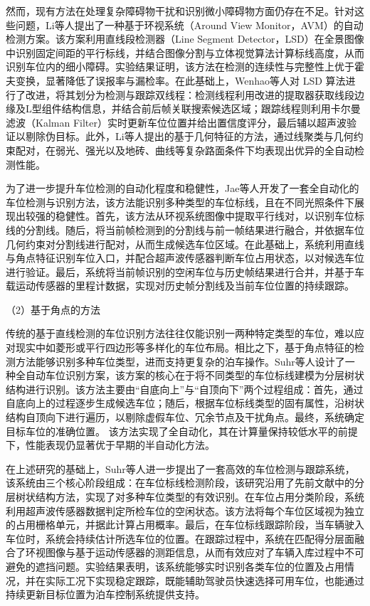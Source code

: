 然而，现有方法在处理复杂障碍物干扰和识别微小障碍物方面仍存在不足。针对这些问题，Li等人\cite{li2017automatic}提出了一种基于环视系统（Around View Monitor，AVM）的自动检测方案。该方案利用直线段检测器（Line Segment Detector，LSD\cite{von2012lsd}）在全景图像中识别固定间距的平行标线，并结合图像分割与立体视觉算法计算标线高度，从而识别车位内的细小障碍。实验结果证明，该方法在检测的连续性与完整性上优于霍夫变换，显著降低了误报率与漏检率。在此基础上，Wenhao等人\cite{zong2018robust}对 LSD 算法进行了改进，将其划分为检测与跟踪双线程：检测线程利用改进的提取器获取线段边缘及L型组件结构信息，并结合前后帧关联搜索候选区域；跟踪线程则利用卡尔曼滤波（Kalman Filter）实时更新车位位置并给出置信度评分，最后辅以超声波验证以剔除伪目标。此外，Li等人\cite{li2018geometric}提出的基于几何特征的方法，通过线聚类与几何约束配对，在弱光、强光以及地砖、曲线等复杂路面条件下均表现出优异的全自动检测性能。

为了进一步提升车位检测的自动化程度和稳健性，Jae等人\cite{suhr2018universal}开发了一套全自动化的车位检测与识别方法，该方法能识别多种类型的车位标线，且在不同光照条件下展现出较强的稳健性。首先，该方法从环视系统图像中提取平行线对，以识别车位标线的分割线。随后，将当前帧检测到的分割线与前一帧结果进行融合，并依据车位几何约束对分割线进行配对，从而生成候选车位区域。在此基础上，系统利用直线与角点特征识别车位入口，并配合超声波传感器判断车位占用状态，以对候选车位进行验证。最后，系统将当前帧识别的空闲车位与历史帧结果进行合并，并基于车载运动传感器的里程计数据，实现对历史帧分割线及当前车位位置的持续跟踪。


（2）基于角点的方法

传统的基于直线检测的车位识别方法往往仅能识别一两种特定类型的车位，难以应对现实中如菱形或平行四边形等多样化的车位布局。相比之下，基于角点特征的检测方法能够识别多种车位类型，进而支持更复杂的泊车操作。Suhr等人\cite{suhr2013full}设计了一种全自动车位识别方案，该方案的核心在于将不同类型的车位标线建模为分层树状结构进行识别。该方法主要由“自底向上”与“自顶向下”两个过程组成：首先，通过自底向上的过程逐步生成候选车位；随后，根据车位标线类型的固有属性，沿树状结构自顶向下进行遍历，以剔除虚假车位、冗余节点及干扰角点。最终，系统确定目标车位的准确位置。
该方法实现了全自动化，其在计算量保持较低水平的前提下，性能表现仍显著优于早期的半自动化方法。

在上述研究的基础上，Suhr等人\cite{suhr2013sensor}进一步提出了一套高效的车位检测与跟踪系统，该系统由三个核心阶段组成：在车位标线检测阶段，该研究沿用了先前文献中的分层树状结构方法\cite{suhr2013full}，实现了对多种车位类型的有效识别。在车位占用分类阶段，系统利用超声波传感器数据判定所检车位的空闲状态。该方法将每个车位区域视为独立的占用栅格单元，并据此计算占用概率。最后，在车位标线跟踪阶段，当车辆驶入车位时，系统会持续估计所选车位的位置。在跟踪过程中，系统在匹配得分层面融合了环视图像与基于运动传感器的测距信息，从而有效应对了车辆入库过程中不可避免的遮挡问题。实验结果表明，该系统能够实时识别各类车位的位置及占用情况，并在实际工况下实现稳定跟踪，既能辅助驾驶员快速选择可用车位，也能通过持续更新目标位置为泊车控制系统提供支持。

